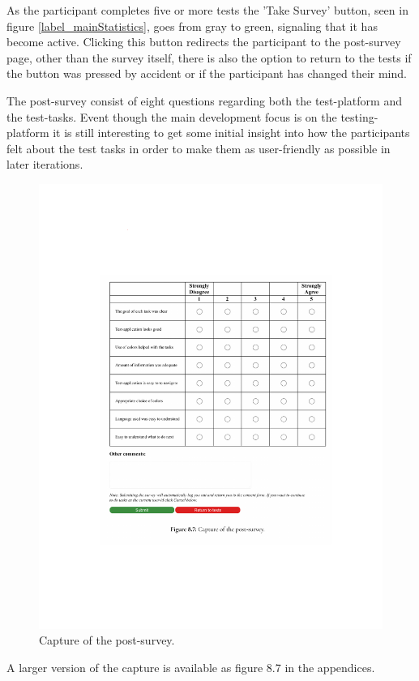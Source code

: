 {	\newpage
		As the participant completes five or more tests the 'Take Survey' button,
		seen in figure \ref{label_mainStatistics}, goes from gray to green,
		signaling that it has become active. Clicking this button redirects the
		participant to the post-survey page, other than the survey itself, there is
		also the option to return to the tests if the button was pressed by
		accident or if the participant has changed their mind.

		The post-survey consist of eight questions regarding both the test-platform
		and the test-tasks. Event though the main development focus is on the
		testing-platform it is still interesting to get some initial insight into
		how the participants felt about the test tasks in order to make them as
		user-friendly as possible in later iterations.

    \begin{figure}[h!]
      \centering
      \includegraphics[trim={2.0cm 4cm 2.0cm 5cm},clip,width=.7\textwidth]{figures/captures/webapp_post_survey.pdf}
      \caption{Capture of the post-survey.}
    \end{figure}

		A larger version of the capture is available as figure 8.7 in the appendices.

}
